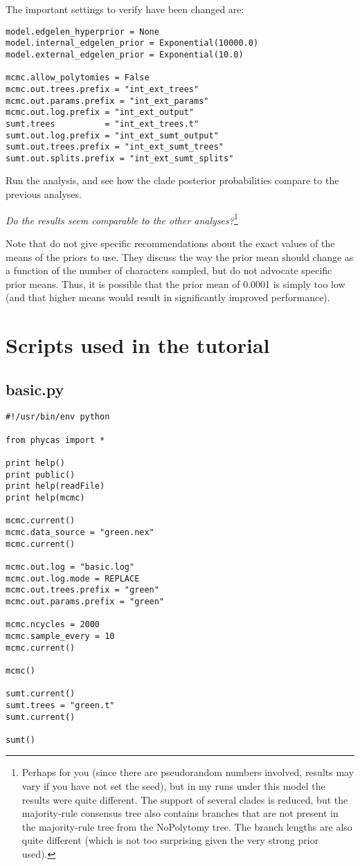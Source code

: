 \documentclass{article}
\newcommand{\QandA}[2]{\textit{#1}\footnote{#2}\xspace}
\begin{document}
The important settings to verify have been changed are:
\begin{verbatim}
model.edgelen_hyperprior = None
model.internal_edgelen_prior = Exponential(10000.0)
model.external_edgelen_prior = Exponential(10.0)

mcmc.allow_polytomies = False
mcmc.out.trees.prefix = "int_ext_trees"
mcmc.out.params.prefix = "int_ext_params"
mcmc.out.log.prefix = "int_ext_output"
sumt.trees          = "int_ext_trees.t"
sumt.out.log.prefix = "int_ext_sumt_output"
sumt.out.trees.prefix = "int_ext_sumt_trees"
sumt.out.splits.prefix = "int_ext_sumt_splits"
\end{verbatim}

Run the analysis, and see how the clade posterior probabilities compare to the previous analyses.

\QandA{Do the results seem comparable to the other analyses?}{Perhaps for you (since there are pseudorandom numbers involved, results may vary if you have not set the seed), but in my runs under this model the results were quite different.
The support of several clades is reduced, but the majority-rule consensus tree also contains 
branches that are not present in the majority-rule tree from the NoPolytomy tree.
The branch lengths are also quite different (which is not too surprising given the very strong prior 
used).}

Note that \citet{YangR2005} do not give specific recommendations about the exact values of the means of  the priors to use.
They discuss the way the prior mean should change as a function of the number of characters sampled, but
do not advocate specific prior means.
Thus, it is possible that the prior mean of 0.0001 is simply too low (and that higher means would result in significantly improved performance).




\newpage
\section{Scripts used in the tutorial}
\subsection{basic.py}\label{basicpy}
\begin{verbatim}
#!/usr/bin/env python

from phycas import *

print help()
print public()
print help(readFile)
print help(mcmc)

mcmc.current()
mcmc.data_source = "green.nex"
mcmc.current()

mcmc.out.log = "basic.log"
mcmc.out.log.mode = REPLACE
mcmc.out.trees.prefix = "green"
mcmc.out.params.prefix = "green"

mcmc.ncycles = 2000 
mcmc.sample_every = 10
mcmc.current()

mcmc()

sumt.current()
sumt.trees = "green.t"
sumt.current()

sumt()
\end{verbatim}
\end{document}
